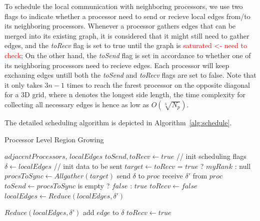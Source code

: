 \documentclass[10pt, conference, compsocconf]{IEEEtran}
\begin{document}
To schedule the local communication with neighboring processors, we use two flags to indicate whether a processor need to send or recieve local edges from/to its neighboring processors. Whenever a processor gathers edges that can be merged into its existing graph, it is considered that it might still need to gather edges, and the \emph{toRecv} flag is set to true until the graph is \textcolor{red}{saturated <- need to check}; On the other hand, the \emph{toSend} flag is set in accordance to whether one of its neighboring processors need to recieve edges. Each processor will keep exchaning edges untill both the \emph{toSend} and \emph{toRecv} flags are set to false. Note that it only takes ${3n-1}$ times to reach the farest processor on the opposite diagonal for a 3D grid, where n denotes the longest side length, the time complexity for collecting all necessary edges is hence as low as ${O(\sqrt[3]{N_p})}$.

The detailed scheduling algorithm is depicted in Algorithm~\ref{alg:schedule}.
\begin{algorithm}
\caption{Processor Level Region Growing}
\label{alg:schedule}
  \begin{algorithmic}[1]
  \REQUIRE $adjacentProcessors$, $localEdges$
  \STATE $toSend, toRecv \leftarrow true$	// init scheduling flags
  \STATE $\delta \leftarrow localEdges$	// init data to be sent
  	\STATE $target \leftarrow toRecv$ = $true$ ? $myRank$ : null
  	\STATE $procsToSync \leftarrow Allgather(target)$
  			\STATE send $\delta$ to $proc$
  		\ENDIF
  			\STATE receive $\delta\prime$ from $proc$
  		\ENDIF
  	\ENDFOR
  	\STATE $toSend \leftarrow procsToSync$ is empty ? $false$ : $true$
  	\STATE $toRecv \leftarrow false$
  	\STATE $localEdges \leftarrow Reduce(localEdges, \delta\prime)$
  \ENDWHILE
  \end{algorithmic}
  \begin{algorithmic} \STATE \end{algorithmic}	%
  \begin{algorithmic}[1]
  \STATE $Reduce(localEdges, \delta\prime)$
  			\STATE add $edge$ to $\delta$
  			\STATE $toRecv \leftarrow true$
  		\ENDIF
  	\ENDFOR	
  \end{algorithmic}
\end{algorithm}
\end{document}
